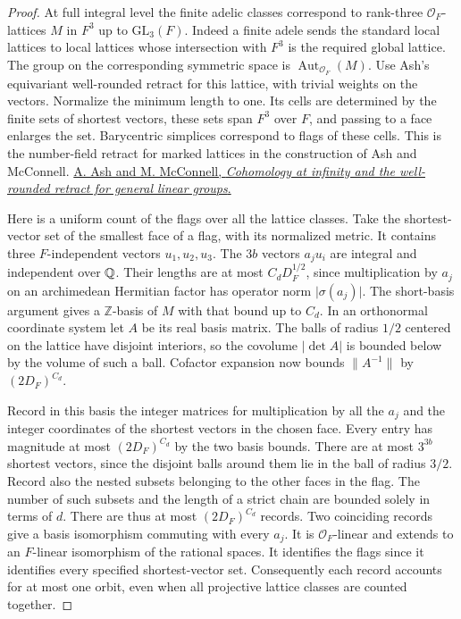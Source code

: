 \documentclass[a4paper,11pt]{article}
\theoremstyle{definition}
\theoremstyle{remark}
\newcommand{\ZZ}{\mathbb Z}\newcommand{\ord}{\operatorname{ord}}
\numberwithin{equation}{section}
\begin{document}
\begin{proof}
At full integral level the finite adelic classes correspond to
rank-three \(\mathcal O_F\)-lattices \(M\) in \(F^3\) up to
\(\mathrm{GL}_3(F)\). Indeed a finite adele sends the standard
local lattices to local lattices whose intersection with \(F^3\)
is the required global lattice. The group on the corresponding
symmetric space is \(\operatorname{Aut}_{\mathcal O_F}(M)\).
Use Ash's equivariant well-rounded retract for this lattice,
with trivial weights on the vectors. Normalize the minimum
length to one. Its cells are determined by the finite sets of
shortest vectors, these sets span \(F^3\) over \(F\), and passing
to a face enlarges the set. Barycentric simplices correspond
to flags of these cells. This is the number-field retract for
marked lattices in the construction of Ash and McConnell.
\href{https://arxiv.org/abs/math/9611220}{A. Ash and M. McConnell,
\emph{Cohomology at infinity and the well-rounded retract for
general linear groups}.}

Here is a uniform count of the flags over all the lattice
classes. Take the shortest-vector set of the smallest face of
a flag, with its normalized metric. It contains three
\(F\)-independent vectors \(u_1,u_2,u_3\). The \(3b\) vectors
\(a_j u_i\) are integral and independent over \(\mathbb Q\). Their
lengths are at most \(C_dD_F^{1/2}\), since multiplication by
\(a_j\) on an archimedean Hermitian factor has operator norm
\(\lvert\sigma(a_j)\rvert\). The short-basis argument gives a
\(\ZZ\)-basis of \(M\) with that bound up to \(C_d\). In an
orthonormal coordinate system let \(A\) be its real basis
matrix. The balls of radius \(1/2\) centered on the lattice
have disjoint interiors, so the covolume \(\lvert\det A\rvert\)
is bounded below by the volume of such a ball. Cofactor
expansion now bounds \(\|A^{-1}\|\) by \((2D_F)^{C_d}\).

Record in this basis the integer matrices for multiplication by
all the \(a_j\) and the integer coordinates of the shortest
vectors in the chosen face. Every entry has magnitude at most
\((2D_F)^{C_d}\) by the two basis bounds. There are at most
\(3^{3b}\) shortest vectors, since the disjoint balls around
them lie in the ball of radius \(3/2\). Record also the nested
subsets belonging to the other faces in the flag. The number
of such subsets and the length of a strict chain are bounded
solely in terms of \(d\). There are thus at most \((2D_F)^{C_d}\)
records. Two coinciding records give a basis isomorphism
commuting with every \(a_j\). It is \(\mathcal O_F\)-linear and
extends to an \(F\)-linear isomorphism of the rational spaces.
It identifies the flags since it identifies every specified
shortest-vector set. Consequently each record accounts for at
most one orbit, even when all projective lattice classes are
counted together.


\end{proof}
\end{document}
